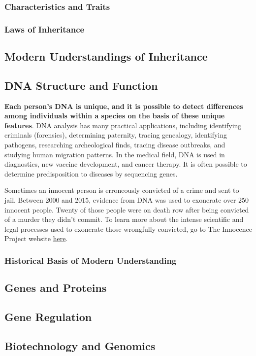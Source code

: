 \documentclass[12pt]{article}
\begin{document}
\subsubsection{Characteristics and Traits}
\subsubsection{Laws of Inheritance}

\subsection{Modern Understandings of Inheritance}
\subsection{DNA Structure and Function}
\textbf{Each person’s DNA is unique, and it is possible to detect differences among individuals within a species on the basis of these unique features}. DNA analysis has many practical applications, including identifying criminals (forensics), determining paternity, tracing genealogy, identifying pathogens, researching archeological finds, tracing disease outbreaks, and studying human migration patterns. In the medical field, DNA is used in diagnostics, new vaccine development, and cancer therapy. It is often possible to determine predisposition to diseases by sequencing genes.

Sometimes an innocent person is erroneously convicted of a crime and sent to jail. Between 2000 and 2015, evidence from DNA was used to exonerate over 250 innocent people. Twenty of those people were on death row after being convicted of a murder they didn’t commit. To learn more about the intense scientific and legal processes used to exonerate those wrongfully convicted, go to The Innocence Project website \href{http://www.openstax.org/l/32innocence}{here}.
\subsubsection{Historical Basis of Modern Understanding}

\subsection{Genes and Proteins}
\subsection{Gene Regulation}
\subsection{Biotechnology and Genomics}
\end{document}
